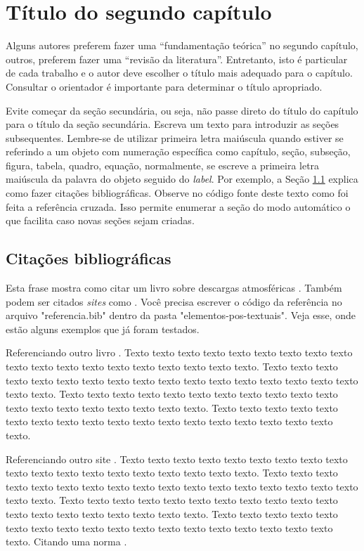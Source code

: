 \chapter{Título do segundo capítulo}
\label{cap:fundamentacao-teorica}

Alguns autores preferem fazer uma ``fundamentação teórica'' no segundo capítulo, outros, preferem fazer uma ``revisão da literatura''. Entretanto, isto é particular de cada trabalho e o autor deve escolher o título mais adequado para o capítulo. Consultar o orientador é importante para determinar o título apropriado.

Evite começar da seção secundária, ou seja, não passe direto do título do capítulo para o título da seção secundária. Escreva um texto para introduzir as seções subsequentes. Lembre-se de utilizar primeira letra maiúscula quando estiver se referindo a um objeto com numeração específica como capítulo, seção, subseção, figura, tabela, quadro, equação, normalmente, se escreve a primeira letra maiúscula da palavra do objeto seguido do \textit{label}. Por exemplo, a Seção \ref{sec:citacoes} explica como fazer citações bibliográficas. Observe no código fonte deste texto como foi feita a referência cruzada. Isso permite enumerar a seção do modo automático o que facilita caso novas seções sejam criadas.  

\section{Citações bibliográficas}\label{sec:citacoes}

    Esta frase mostra como citar um livro sobre descargas atmosféricas \cite{rakov2003lightning}. Também podem ser citados \textit{sites} como . Você precisa escrever o código da referência no arquivo "referencia.bib" dentro da pasta "elementos-pos-textuais". Veja esse, onde estão alguns exemplos que já foram testados.        

    Referenciando outro livro \cite{LangtangenLogg2017}. Texto texto texto texto texto texto texto texto texto texto texto texto texto texto texto texto texto texto texto. Texto texto texto texto texto texto texto texto texto texto texto texto texto texto texto texto texto texto texto. Texto texto texto texto texto texto texto texto texto texto texto texto texto texto texto texto texto texto texto. Texto texto texto texto texto texto texto texto texto texto texto texto texto texto texto texto texto texto texto.

    Referenciando outro site \cite{secretaria1999}. Texto texto texto texto texto texto texto texto texto texto texto texto texto texto texto texto texto texto texto. Texto texto texto texto texto texto texto texto texto texto texto texto texto texto texto texto texto texto texto. Texto texto texto texto texto texto texto texto texto texto texto texto texto texto texto texto texto texto texto. Texto texto texto texto texto texto texto texto texto texto texto texto texto texto texto texto texto texto texto. Citando uma norma \cite{NBR10520:2002}.
        
